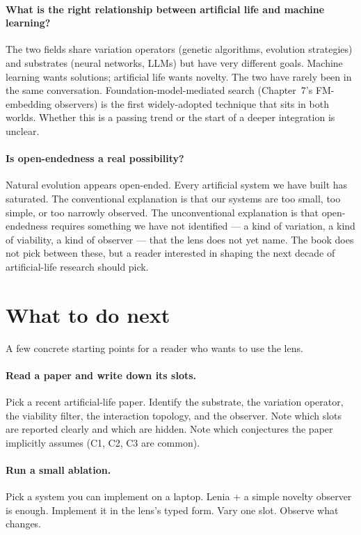 \paragraph{What is the right relationship between artificial life
and machine learning?} The two fields share variation operators
(genetic algorithms, evolution strategies) and substrates (neural
networks, LLMs) but have very different goals. Machine learning wants
solutions; artificial life wants novelty. The two have rarely been in
the same conversation. Foundation-model-mediated search (Chapter~7's
FM-embedding observers) is the first widely-adopted technique that
sits in both worlds. Whether this is a passing trend or the start of a
deeper integration is unclear.

\paragraph{Is open-endedness a real possibility?} Natural evolution
appears open-ended. Every artificial system we have built has
saturated. The conventional explanation is that our systems are too
small, too simple, or too narrowly observed. The unconventional
explanation is that open-endedness requires something we have not
identified --- a kind of variation, a kind of viability, a kind of
observer --- that the lens does not yet name. The book does not pick
between these, but a reader interested in shaping the next decade of
artificial-life research should pick.

\section{What to do next}

A few concrete starting points for a reader who wants to use the
lens.

\paragraph{Read a paper and write down its slots.} Pick a recent
artificial-life paper. Identify the substrate, the variation
operator, the viability filter, the interaction topology, and the
observer. Note which slots are reported clearly and which are
hidden. Note which conjectures the paper implicitly assumes (C1, C2,
C3 are common).

\paragraph{Run a small ablation.} Pick a system you can implement on
a laptop. Lenia + a simple novelty observer is enough. Implement it
in the lens's typed form. Vary one slot. Observe what changes.

